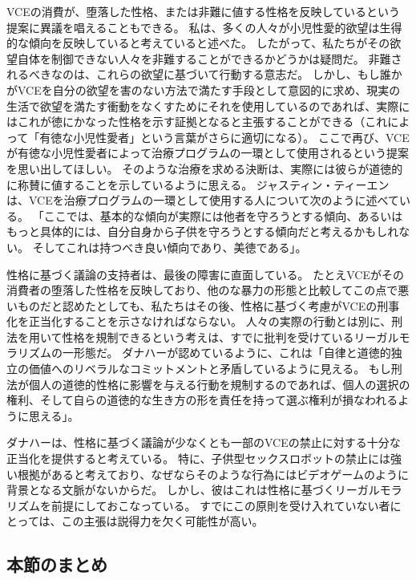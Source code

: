 \documentclass[paper=a4,book,openany]{jlreq}
\begin{document}
VCEの消費が、堕落した性格、または非難に値する性格を反映しているという提案に異議を唱えることもできる。
私は、多くの人々が小児性愛的欲望は生得的な傾向を反映していると考えていると述べた。
したがって、私たちがその欲望自体を制御できない人々を非難することができるかどうかは疑問だ。
非難されるべきなのは、これらの欲望に基づいて行動する意志だ。
しかし、もし誰かがVCEを自分の欲望を害のない方法で満たす手段として意図的に求め、現実の生活で欲望を満たす衝動をなくすためにそれを使用しているのであれば、実際にはこれが徳にかなった性格を示す証拠となると主張することができる（これによって「有徳な小児性愛者」という言葉がさらに適切になる）。
ここで再び、VCEが有徳な小児性愛者によって治療プログラムの一環として使用されるという提案を思い出してほしい。
そのような治療を求める決断は、実際には彼らが道徳的に称賛に値することを示しているように思える。
ジャスティン・ティーエンは、VCEを治療プログラムの一環として使用する人について次のように述べている。
「ここでは、基本的な傾向が実際には他者を守ろうとする傾向、あるいはもっと具体的には、自分自身から子供を守ろうとする傾向だと考えるかもしれない。
そしてこれは持つべき良い傾向であり、美徳である」\citep[p.1159]{tiehen18:_virtual_ethic_creep_act}。

性格に基づく議論の支持者は、最後の障害に直面している。
たとえVCEがその消費者の堕落した性格を反映しており、他のな暴力の形態と比較してこの点で悪いものだと認めたとしても、私たちはその後、性格に基づく考慮がVCEの刑事化を正当化することを示さなければならない。
人々の実際の行動とは別に、刑法を用いて性格を規制できるという考えは、すでに批判を受けているリーガルモラリズムの一形態だ。
ダナハーが認めているように、これは「自律と道徳的独立の価値へのリベラルなコミットメントと矛盾しているように見える。
もし刑法が個人の道徳的性格に影響を与える行動を規制するのであれば、個人の選択の権利、そして自らの道徳的な生き方の形を責任を持って選ぶ権利が損なわれるように思える」\citep[p.79]{danaher17:_robot_rape_robot_child_sexual_abuse}。

ダナハーは、性格に基づく議論が少なくとも一部のVCEの禁止に対する十分な正当化を提供すると考えている。
特に、子供型セックスロボットの禁止には強い根拠があると考えており、なぜならそのような行為にはビデオゲームのように背景となる文脈がないからだ。
しかし、彼はこれは性格に基づくリーガルモラリズムを前提にしておこなっている。
すでにこの原則を受け入れていない者にとっては、この主張は説得力を欠く可能性が高い。

\subsection{本節のまとめ}
\end{document}
